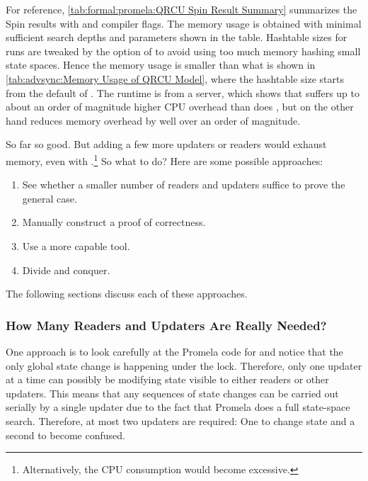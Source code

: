 For reference, \cref{tab:formal:promela:QRCU Spin Result Summary}
summarizes the Spin results with  and 
compiler flags.
The memory usage is obtained with minimal sufficient
search depths and  parameters shown in the table.
Hashtable sizes for  runs are tweaked by
the  option of  to avoid using too much
memory hashing small state spaces.
Hence the memory usage is smaller than what is shown in
\cref{tab:advsync:Memory Usage of QRCU Model}, where the
hashtable size starts from the default of .
The runtime is from a  server, which shows that 
suffers up to about an order of magnitude higher CPU overhead
than does , but on the other hand reduces memory overhead
by well over an order of magnitude.

So far so good.
But adding a few more updaters or readers would exhaust memory, even
with .\footnote{
	Alternatively, the CPU consumption would become excessive.}
So what to do?
Here are some possible approaches:

\begin{enumerate}
\item	See whether a smaller number of readers and updaters suffice
	to prove the general case.
\item	Manually construct a proof of correctness.
\item	Use a more capable tool.
\item	Divide and conquer.
\end{enumerate}

The following sections discuss each of these approaches.

\subsubsection{How Many Readers and Updaters Are Really Needed?}
\label{sec:formal:How Many Readers and Updaters Are Really Needed?}

One approach is to look carefully at the Promela code for
 and notice that the only global state
change is happening under the lock.
Therefore, only one updater at a time can possibly be modifying
state visible to either readers or other updaters.
This means that any sequences of state changes can be carried
out serially by a single updater due to the fact that Promela does a full
state-space search.
Therefore, at most two updaters are required:
One to change state and a second to become confused.

